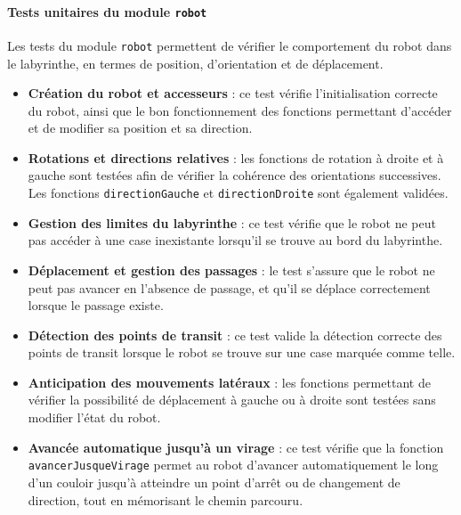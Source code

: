 \paragraph{Tests unitaires du module \texttt{robot}}

Les tests du module \texttt{robot} permettent de vérifier le comportement du robot
dans le labyrinthe, en termes de position, d’orientation et de déplacement.

\begin{itemize}
    \item \textbf{Création du robot et accesseurs} :  
    ce test vérifie l’initialisation correcte du robot, ainsi que le bon fonctionnement
    des fonctions permettant d’accéder et de modifier sa position et sa direction.

    \item \textbf{Rotations et directions relatives} :  
    les fonctions de rotation à droite et à gauche sont testées afin de vérifier
    la cohérence des orientations successives.
    Les fonctions \texttt{directionGauche} et \texttt{directionDroite} sont également validées.

    \item \textbf{Gestion des limites du labyrinthe} :  
    ce test vérifie que le robot ne peut pas accéder à une case inexistante
    lorsqu’il se trouve au bord du labyrinthe.

    \item \textbf{Déplacement et gestion des passages} :  
    le test s’assure que le robot ne peut pas avancer en l’absence de passage,
    et qu’il se déplace correctement lorsque le passage existe.

    \item \textbf{Détection des points de transit} :  
    ce test valide la détection correcte des points de transit lorsque le robot
    se trouve sur une case marquée comme telle.

    \item \textbf{Anticipation des mouvements latéraux} :  
    les fonctions permettant de vérifier la possibilité de déplacement
    à gauche ou à droite sont testées sans modifier l’état du robot.

    \item \textbf{Avancée automatique jusqu’à un virage} :  
    ce test vérifie que la fonction \texttt{avancerJusqueVirage} permet au robot
    d’avancer automatiquement le long d’un couloir jusqu’à atteindre un point
    d’arrêt ou de changement de direction, tout en mémorisant le chemin parcouru.
\end{itemize}



